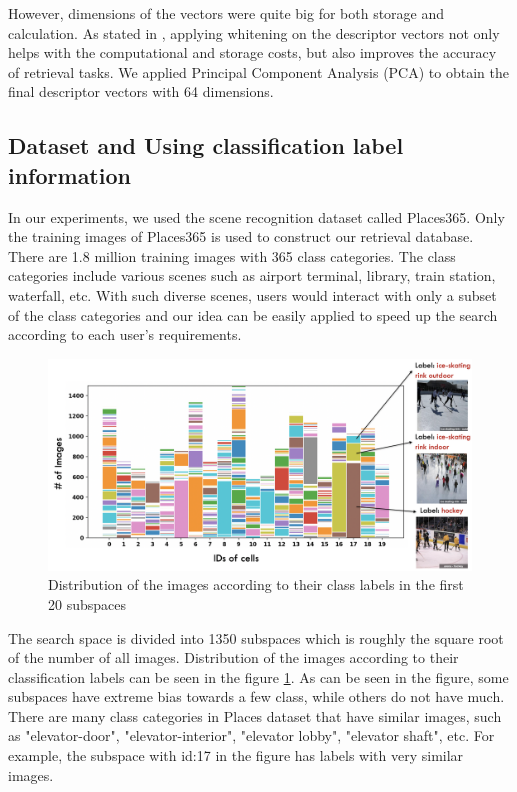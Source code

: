 However, dimensions of the vectors were quite big for both storage and calculation. 
As stated in \cite{jegou2012negative}, applying whitening on the descriptor vectors not only helps with the computational and storage costs, but also improves the accuracy of retrieval tasks.
We applied Principal Component Analysis (PCA) to obtain the final descriptor vectors with 64 dimensions.


\subsection{Dataset and Using classification label information}

In our experiments, we used the scene recognition dataset called Places365\cite{zhou2017places}. 
Only the training images of Places365 is used to construct our retrieval database. 
There are 1.8 million training images with 365 class categories. 
The class categories include various scenes such as airport terminal, library, train station, waterfall, etc. 
With such diverse scenes, users would interact with only a subset of the class categories and our idea can be easily applied to speed up the search according to each user's requirements.

\begin{figure}
    \centering
    \includegraphics[width=\textwidth]{thesis/images/label_dist-fig.png}
    \caption{Distribution of the images according to their class labels in the first 20 subspaces}
    \label{fig:label-dist}
\end{figure}

The search space is divided into 1350 subspaces which is roughly the square root of the number of all images. 
Distribution of the images according to their classification labels can be seen in the figure \ref{fig:label-dist}.
As can be seen in the figure, some subspaces have extreme bias towards a few class, while others do not have much. 
There are many class categories in Places dataset that have similar images, such as "elevator-door", "elevator-interior", "elevator lobby", "elevator shaft", etc.
For example, the subspace with id:17 in the figure has labels with very similar images.

